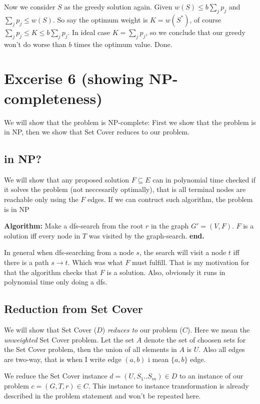 \documentclass[a4paper,11pt]{article}
\begin{document}
Now we consider $S$ as the greedy solution again.
Given $w(S) \leq b \sum_{j} p_j$ and $\sum_{j} p_j \leq w(S)$.
So say the optimum weight is $K=w(S^*)$, of course
$\sum_{j} p_j \leq K \leq b \sum_{j} p_j$.
In ideal case $K = \sum_{j} p_j$,
so we conclude that our greedy won't do worse than $b$
times the optimum value. Done.

\section{Excerise 6 (showing NP-completeness)}

We will show that the problem is NP-complete:
First we show that the problem is in NP, then
we show that Set Cover reduces to our problem.

\subsection{in NP?}

We will show that any proposed solution $F \subseteq E$
can in polynomial time checked if it solves the problem
(not neccesarily optimally),
that is all terminal nodes are reachable only using the $F$ edges.
If we can contruct such algorithm, the problem is in NP

\textbf{Algorithm:} Make a dfs-search from the root $r$ in the graph
$G' = (V, F)$. $F$ is a solution iff every node in $T$
was visited by the graph-search. \textbf{end.}

In general when dfs-searching from a node $s$,
the search will visit a node $t$ iff there is a path $s \to t$.
Which was what $F$ must fulfill. That is my motivation for that
the algorithm checks that $F$ is a solution.
Also, obviously it runs in polynomial time only doing a dfs.

\subsection{Reduction from Set Cover}

We will show that Set Cover ($D$) \emph{reduces to} our problem ($C$).
Here we mean the \emph{unweighted} Set Cover problem. Let the set
$A$ denote the set of choosen sets for the Set Cover problem,
then the union of all elements in $A$ is $U$.
Also all edges are two-way, that is when I write edge $(a, b)$ i mean
$\{a, b\}$ edge.

We reduce the Set Cover instance $d = (U, S_1..S_m) \in D$ to an instance
of our problem $c = (G, T, r) \in C$. This instance to instance transformation is
already described in the problem statement and won't be repeated here.
\end{document}
